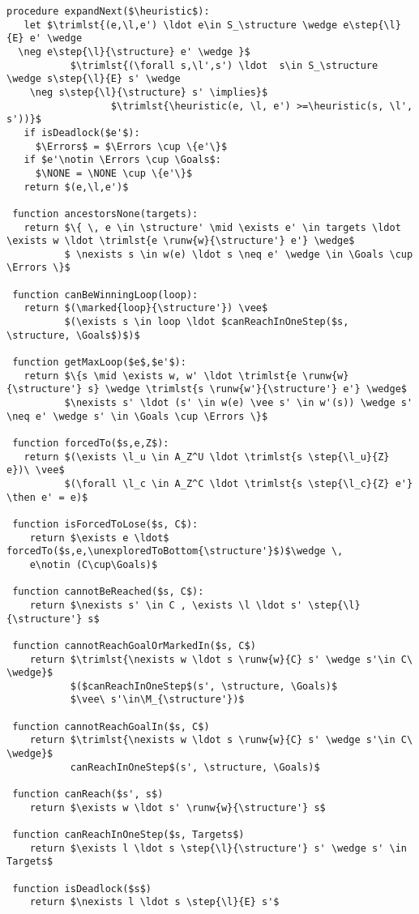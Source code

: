 \begin{lstlisting}[language={pseudocode},label={lst:dcs.aux},caption={auxiliary procedures.},float=ht, frame=single]
 procedure expandNext($\heuristic$):
   let $\trimlst{(e,\l,e') \ldot e\in S_\structure \wedge e\step{\l}{E} e' \wedge   
  \neg e\step{\l}{\structure} e' \wedge }$ 
           $\trimlst{(\forall s,\l',s') \ldot  s\in S_\structure \wedge s\step{\l}{E} s' \wedge   
    \neg s\step{\l}{\structure} s' \implies}$ 
                  $\trimlst{\heuristic(e, \l, e') >=\heuristic(s, \l',   s'))}$
   if isDeadlock($e'$):
     $\Errors$ = $\Errors \cup \{e'\}$
   if $e'\notin \Errors \cup \Goals$:
     $\NONE = \NONE \cup \{e'\}$
   return $(e,\l,e')$
 
 function ancestorsNone(targets):
   return $\{ \, e \in \structure' \mid \exists e' \in targets \ldot \exists w \ldot \trimlst{e \runw{w}{\structure'} e'} \wedge$
          $ \nexists s \in w(e) \ldot s \neq e' \wedge \in \Goals \cup \Errors \}$
   
 function canBeWinningLoop(loop):
   return $(\marked{loop}{\structure'}) \vee$ 
          $(\exists s \in loop \ldot $canReachInOneStep($s, \structure, \Goals$)$)$
   
 function getMaxLoop($e$,$e'$):
   return $\{s \mid \exists w, w' \ldot \trimlst{e \runw{w}{\structure'} s} \wedge \trimlst{s \runw{w'}{\structure'} e'} \wedge$ 
          $\nexists s' \ldot (s' \in w(e) \vee s' \in w'(s)) \wedge s' \neq e' \wedge s' \in \Goals \cup \Errors \}$

 function forcedTo($s,e,Z$):
   return $(\exists \l_u \in A_Z^U \ldot \trimlst{s \step{\l_u}{Z} e})\ \vee$
          $(\forall \l_c \in A_Z^C \ldot \trimlst{s \step{\l_c}{Z} e'} \then e' = e)$ 
          
 function isForcedToLose($s, C$):
    return $\exists e \ldot$ forcedTo($s,e,\unexploredToBottom{\structure'}$)$\wedge \,
    e\notin (C\cup\Goals)$
    
 function cannotBeReached($s, C$):
    return $\nexists s' \in C , \exists \l \ldot s' \step{\l}{\structure'} s$
   
 function cannotReachGoalOrMarkedIn($s, C$)
    return $\trimlst{\nexists w \ldot s \runw{w}{C} s' \wedge s'\in C\ \wedge}$ 
           $($canReachInOneStep$(s', \structure, \Goals)$
           $\vee\ s'\in\M_{\structure'})$
           
 function cannotReachGoalIn($s, C$)
    return $\trimlst{\nexists w \ldot s \runw{w}{C} s' \wedge s'\in C\ \wedge}$ 
           canReachInOneStep$(s', \structure, \Goals)$
           
 function canReach($s', s$)
    return $\exists w \ldot s' \runw{w}{\structure'} s$

 function canReachInOneStep($s, Targets$)
    return $\exists l \ldot s \step{\l}{\structure'} s' \wedge s' \in Targets$

 function isDeadlock($s$)
    return $\nexists l \ldot s \step{\l}{E} s'$
\end{lstlisting}

